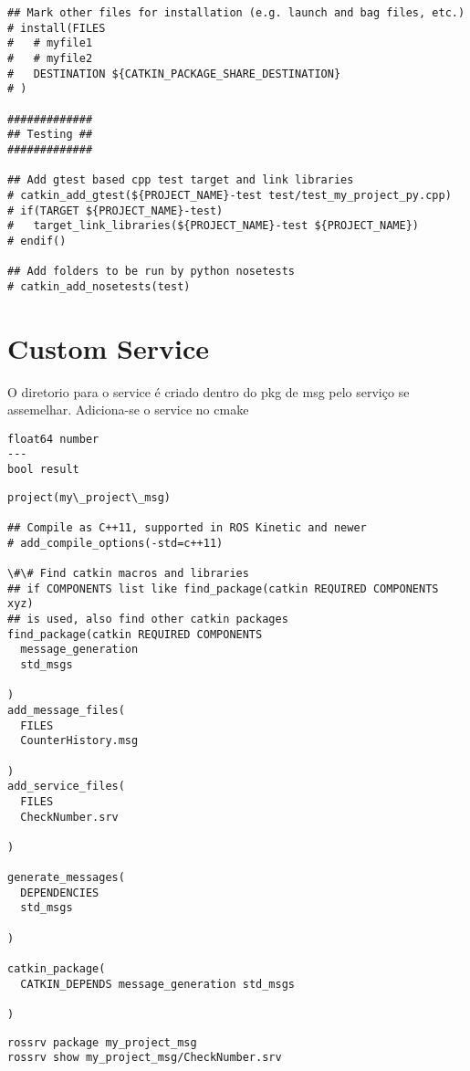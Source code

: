 \documentclass[letterpaper]{article}
\begin{document}
\begin{lstlisting}[style=mystyle, title=src/my\_project\_py/CMakeLists.txt]
## Mark other files for installation (e.g. launch and bag files, etc.)
# install(FILES
#   # myfile1
#   # myfile2
#   DESTINATION ${CATKIN_PACKAGE_SHARE_DESTINATION}
# )

#############
## Testing ##
#############

## Add gtest based cpp test target and link libraries
# catkin_add_gtest(${PROJECT_NAME}-test test/test_my_project_py.cpp)
# if(TARGET ${PROJECT_NAME}-test)
#   target_link_libraries(${PROJECT_NAME}-test ${PROJECT_NAME})
# endif()

## Add folders to be run by python nosetests
# catkin_add_nosetests(test)

\end{lstlisting}
\section{Custom Service}
O diretorio para o service é criado dentro do pkg de msg pelo serviço se assemelhar. 
Adiciona-se o service no cmake 


\begin{lstlisting}[style=xmlstyle, title=my\_project\_msg/srv/CheckNumber.srv]
float64 number
---
bool result
\end{lstlisting}
\begin{lstlisting}[style=xmlstyle, title=my_project_msg/CMakeLists.txt)]
project(my\_project\_msg)

## Compile as C++11, supported in ROS Kinetic and newer
# add_compile_options(-std=c++11)

\#\# Find catkin macros and libraries
## if COMPONENTS list like find_package(catkin REQUIRED COMPONENTS xyz)
## is used, also find other catkin packages
find_package(catkin REQUIRED COMPONENTS
  message_generation
  std_msgs

)
add_message_files(
  FILES
  CounterHistory.msg

)
add_service_files(
  FILES
  CheckNumber.srv

)

generate_messages(
  DEPENDENCIES
  std_msgs

)

catkin_package(
  CATKIN_DEPENDS message_generation std_msgs

)
\end{lstlisting}
\begin{lstlisting}[style=mystyle, title=terminal bash]
rossrv package my_project_msg
rossrv show my_project_msg/CheckNumber.srv
\end{lstlisting}
\end{document}
